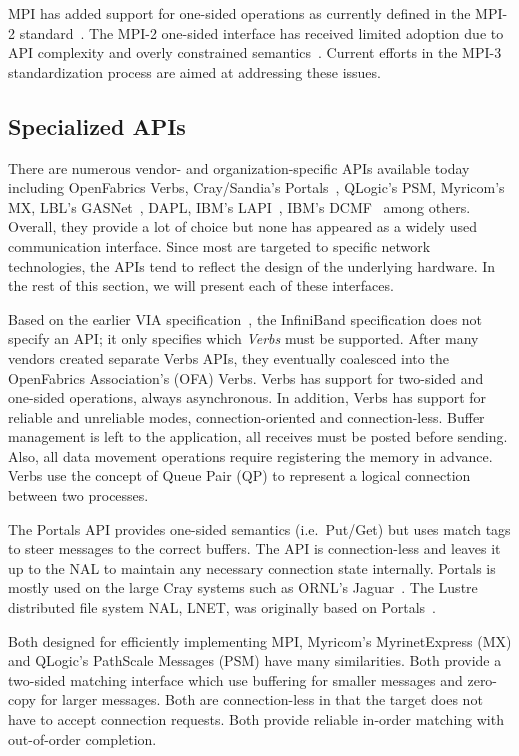 MPI has added support for one-sided operations as currently defined
in the MPI-2 standard~\cite{geist96:_mpi2_lyon}. The MPI-2 one-sided
interface has received limited adoption due to API complexity and
overly constrained semantics~\cite{bonachea-upc-mpi2}. Current efforts
in the MPI-3 standardization process are aimed at addressing these
issues. 


\subsection{Specialized APIs} There are numerous vendor- and
organization-specific APIs available today including OpenFabrics
Verbs, Cray/Sandia's Portals~\cite{portals}, QLogic's
PSM, Myricom's MX, LBL's GASNet~\cite{gasnet}, 
DAPL, IBM's LAPI~\cite{lapi_a_1998}, IBM's 
DCMF~\cite{Kumar:2008:DCM:1375527.1375544} among others. 
Overall, they provide a lot of choice but none has appeared as 
a widely used communication interface. Since most are targeted to 
specific network technologies, the APIs tend to reflect the design 
of the underlying hardware. In the rest of this section, we will 
present each of these interfaces.

Based on the earlier VIA specification~\cite{via}, the InfiniBand specification does not specify
an API; it only specifies which \emph{Verbs} must be supported. After many vendors created
separate Verbs APIs, they eventually coalesced into the OpenFabrics Association's (OFA)
Verbs. Verbs has support for two-sided and one-sided operations, always asynchronous. 
In addition, Verbs has support for reliable and unreliable modes, connection-oriented
and connection-less. Buffer management is left to the application, all receives must be 
posted before sending. Also, all data movement operations require registering the memory 
in advance. Verbs use the concept of Queue Pair (QP) to represent a logical connection between 
two processes.

The Portals API provides one-sided semantics (i.e.\ Put/Get) but uses match tags to steer
messages to the correct buffers. The API is connection-less and leaves it up to the NAL to
maintain any necessary connection state internally. Portals is mostly used on the large
Cray systems such as ORNL's Jaguar~\cite{jaguar_cug_2010}.  The
Lustre distributed file system NAL, LNET, was originally based on Portals~\cite{lnet}.

Both designed for efficiently implementing MPI, Myricom's MyrinetExpress (MX) and 
QLogic's PathScale Messages (PSM) have many similarities. Both provide a two-sided matching 
interface which use buffering for smaller messages and zero-copy for larger messages.  
Both are connection-less in that the target does not have to accept connection requests.  Both provide reliable
in-order matching with out-of-order completion.

